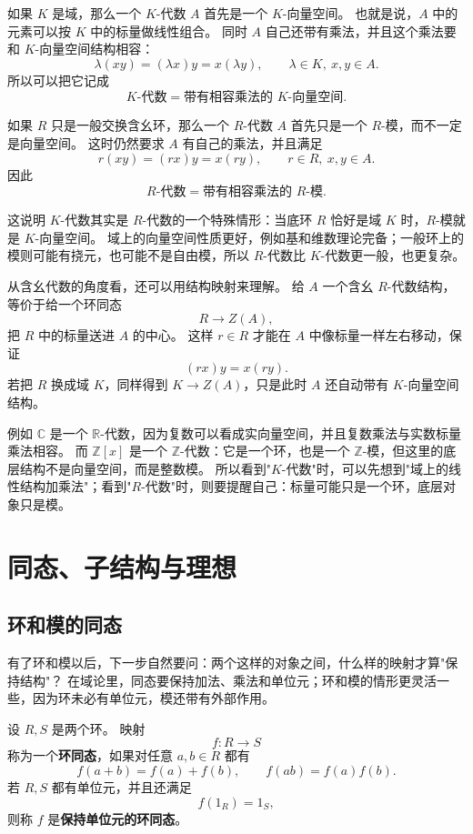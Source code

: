 如果 $K$ 是域，那么一个 $K$-代数 $A$ 首先是一个 $K$-向量空间。
也就是说，$A$ 中的元素可以按 $K$ 中的标量做线性组合。
同时 $A$ 自己还带有乘法，并且这个乘法要和 $K$-向量空间结构相容：
\[
\lambda(xy)=(\lambda x)y=x(\lambda y),\qquad
\lambda\in K,\ x,y\in A.
\]
所以可以把它记成
\[
\text{$K$-代数}=\text{带有相容乘法的 $K$-向量空间}.
\]

如果 $R$ 只是一般交换含幺环，那么一个 $R$-代数 $A$ 首先只是一个 $R$-模，而不一定是向量空间。
这时仍然要求 $A$ 有自己的乘法，并且满足
\[
r(xy)=(rx)y=x(ry),\qquad r\in R,\ x,y\in A.
\]
因此
\[
\text{$R$-代数}=\text{带有相容乘法的 $R$-模}.
\]

这说明 $K$-代数其实是 $R$-代数的一个特殊情形：当底环 $R$ 恰好是域 $K$ 时，$R$-模就是 $K$-向量空间。
域上的向量空间性质更好，例如基和维数理论完备；一般环上的模则可能有挠元，也可能不是自由模，所以 $R$-代数比 $K$-代数更一般，也更复杂。

从含幺代数的角度看，还可以用结构映射来理解。
给 $A$ 一个含幺 $R$-代数结构，等价于给一个环同态
\[
R\to Z(A),
\]
把 $R$ 中的标量送进 $A$ 的中心。
这样 $r\in R$ 才能在 $A$ 中像标量一样左右移动，保证
\[
(rx)y=x(ry).
\]
若把 $R$ 换成域 $K$，同样得到 $K\to Z(A)$，只是此时 $A$ 还自动带有 $K$-向量空间结构。

例如 $\mathbb C$ 是一个 $\mathbb R$-代数，因为复数可以看成实向量空间，并且复数乘法与实数标量乘法相容。
而 $\mathbb Z[x]$ 是一个 $\mathbb Z$-代数：它是一个环，也是一个 $\mathbb Z$-模，但这里的底层结构不是向量空间，而是整数模。
所以看到"$K$-代数"时，可以先想到"域上的线性结构加乘法"；看到"$R$-代数"时，则要提醒自己：标量可能只是一个环，底层对象只是模。

\section{同态、子结构与理想}\label{sec:hom-substructure-ideals}

\subsection{环和模的同态}\label{sec:ring-module-homomorphism}

有了环和模以后，下一步自然要问：两个这样的对象之间，什么样的映射才算"保持结构"？
在域论里，同态要保持加法、乘法和单位元；环和模的情形更灵活一些，因为环未必有单位元，模还带有外部作用。

\begin{definition}[环同态]\label{def:ring-homomorphism}
设 $R,S$ 是两个环。
映射
\[
f:R\to S
\]
称为一个\textbf{环同态}，如果对任意 $a,b\in R$ 都有
\[
f(a+b)=f(a)+f(b),\qquad f(ab)=f(a)f(b).
\]
若 $R,S$ 都有单位元，并且还满足
\[
f(1_R)=1_S,
\]
则称 $f$ 是\textbf{保持单位元的环同态}。
\end{definition}


